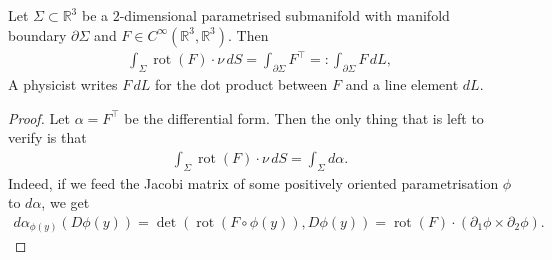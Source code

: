 \begin{theorem}\label{thm:stokes-3}
	Let $ \Sigma \subset \mathbb{R}^{3}$ be a $2$-dimensional parametrised submanifold with manifold boundary $\partial \Sigma$ and $F \in C^{\infty}(\mathbb{R}^{3}, \mathbb{R}^{3})$. Then
	\begin{align*}
		\int_{\Sigma } \operatorname{rot} (F) \cdot \nu \, dS = \int_{\partial \Sigma } F^\top =: \int_{\partial \Sigma } F \, dL,
	\end{align*}
	A physicist writes $F \, dL$ for the dot product between $F$ and a line element $dL$.
\end{theorem}
\begin{proof}
    Let $\alpha = F^\top $ be the differential form. Then the only thing that is left to verify is that
    \begin{align*}
        \int_{\Sigma } \operatorname{rot} (F) \cdot \nu \, dS = \int_{\Sigma } d\alpha.
    \end{align*}
    Indeed, if we feed the Jacobi matrix of some positively oriented parametrisation $\phi$ to $d\alpha $, we get
    \begin{align*}
        d\alpha_{\phi(y)} (D \phi(y)) = \det ( \operatorname{rot} (F \circ \phi(y)), D\phi(y)) = \operatorname{rot} (F) \cdot (\partial_{1} \phi \times \partial_{2}\phi).
    \end{align*}
\end{proof}

